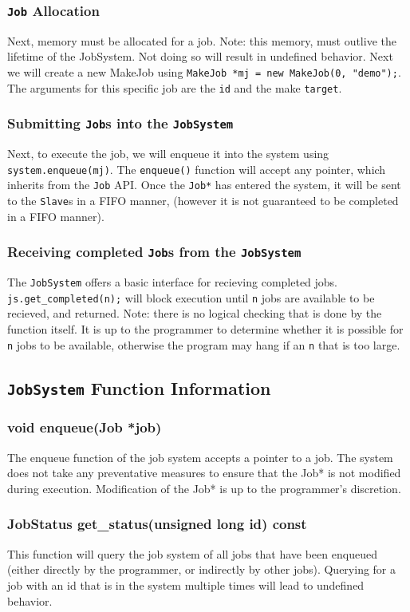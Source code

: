 \documentclass{article}
\begin{document}
		\subsubsection{\texttt{Job} Allocation}
			Next, memory must be allocated for a job. Note: this memory, must outlive the lifetime of the JobSystem. Not doing so will result in undefined behavior. Next we will create a new MakeJob using \texttt{MakeJob *mj = new MakeJob(0, "demo");}. The arguments for this specific job are the \texttt{id} and the make \texttt{target}. 
		\subsubsection{Submitting \texttt{Job}s into the \texttt{JobSystem}}
			Next, to execute the job, we will enqueue it into the system using \texttt{system.enqueue(mj)}. The \texttt{enqueue()} function will accept any pointer, which inherits from the \texttt{Job} API. Once the \texttt{Job*} has entered the system, it will be sent to the \texttt{Slave}s in a FIFO manner, (however it is not guaranteed to be completed in a FIFO manner).
		\subsubsection{Receiving completed \texttt{Job}s from the \texttt{JobSystem}}
			The \texttt{JobSystem} offers a basic interface for recieving completed jobs. \texttt{js.get\_completed(n);} will block execution until \texttt{n} jobs are available to be recieved, and returned. Note: there is no logical checking that is done by the function itself. It is up to the programmer to determine whether it is possible for \texttt{n} jobs to be available, otherwise the program may hang if an \texttt{n} that is too large.
	\subsection {\texttt{JobSystem} Function Information}
		\subsubsection{void enqueue(Job *job)}
			The enqueue function of the job system accepts a pointer to a job. The system does not take any preventative measures to ensure that the Job* is not modified during execution. Modification of the Job* is up to the programmer's discretion.
		\subsubsection{JobStatus get\_status(unsigned long id) const}
			This function will query the job system of all jobs that have been enqueued (either directly by the programmer, or indirectly by other jobs). Querying for a job with an id that is in the system multiple times will lead to undefined behavior.
\end{document}
